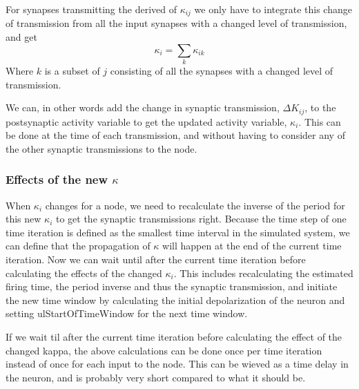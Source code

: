 			For synapses transmitting the derived of $\kappa_{ij}$ we only have to integrate this change of transmission from all the input synapses with a changed level of transmission, and get
			\begin{equation}
				\kappa_i = \sum_k{\kappa_{ik}}
			\end{equation}
			Where ${k}$ is a subset of ${j}$ consisting of all the synapses with a changed level of transmission.

			We can, in other words add the change in synaptic transmission, $\Delta K_{ij}$, to the postsynaptic activity variable to get the updated activity variable, $\kappa_i$.
			This can be done at the time of each transmission, and without having to consider any of the other synaptic transmissions to the node.
			

			\subsubsection{Effects of the new $\kappa$}
			When $\kappa_i$ changes for a node, we need to recalculate the inverse of the period for this new $\kappa_i$ to get the synaptic transmissions right.
			Because the time step of one time iteration is defined as the smallest time interval in the simulated system, we can define that the propagation of $\kappa$ will happen at the end of the current time iteration. %
			Now %
			 we can wait until after the current time iteration before calculating the effects of the changed $\kappa_i$.
			This includes recalculating the estimated firing time, the period inverse and thus the synaptic transmission, and initiate the new time window by calculating the initial depolarization of the neuron and setting 
				ulStartOfTimeWindow for the next time window.

			If we wait til after the current time iteration before calculating the effect of the changed kappa, the above calculations can be done once per time iteration instead of once for each input to the node.
			This can be wieved as a time delay in the neuron, and is probably  very short compared to what it should be. %


